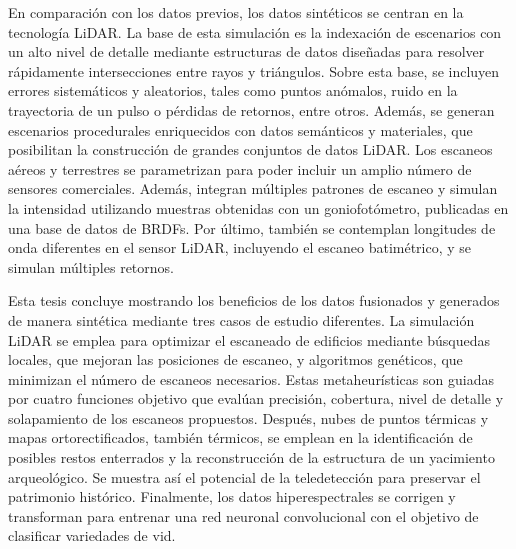 En comparación con los datos previos, los datos sintéticos se centran en la tecnología LiDAR. La base de esta simulación es la indexación de escenarios con un alto nivel de detalle mediante estructuras de datos diseñadas para resolver rápidamente intersecciones entre rayos y triángulos. Sobre esta base, se incluyen errores sistemáticos y aleatorios, tales como puntos anómalos, ruido en la trayectoria de un pulso o pérdidas de retornos, entre otros. Además, se generan escenarios procedurales enriquecidos con datos semánticos y materiales, que posibilitan la construcción de grandes conjuntos de datos LiDAR. Los escaneos aéreos y terrestres se parametrizan para poder incluir un amplio número de sensores comerciales. Además, integran múltiples patrones de escaneo y simulan la intensidad utilizando muestras obtenidas con un goniofotómetro, publicadas en una base de datos de BRDFs. Por último, también se contemplan longitudes de onda diferentes en el sensor LiDAR, incluyendo el escaneo batimétrico, y se simulan múltiples retornos.

Esta tesis concluye mostrando los beneficios de los datos fusionados y generados de manera sintética mediante tres casos de estudio diferentes. La simulación LiDAR se emplea para optimizar el escaneado de edificios mediante búsquedas locales, que mejoran las posiciones de escaneo, y algoritmos genéticos, que minimizan el número de escaneos necesarios. Estas metaheurísticas son guiadas por cuatro funciones objetivo que evalúan precisión, cobertura, nivel de detalle y solapamiento de los escaneos propuestos. Después, nubes de puntos térmicas y mapas ortorectificados, también térmicos, se emplean en la identificación de posibles restos enterrados y la reconstrucción de la estructura de un yacimiento arqueológico. Se muestra así el potencial de la teledetección para preservar el patrimonio histórico. Finalmente, los datos hiperespectrales se corrigen y transforman para entrenar una red neuronal convolucional con el objetivo de clasificar variedades de vid.
